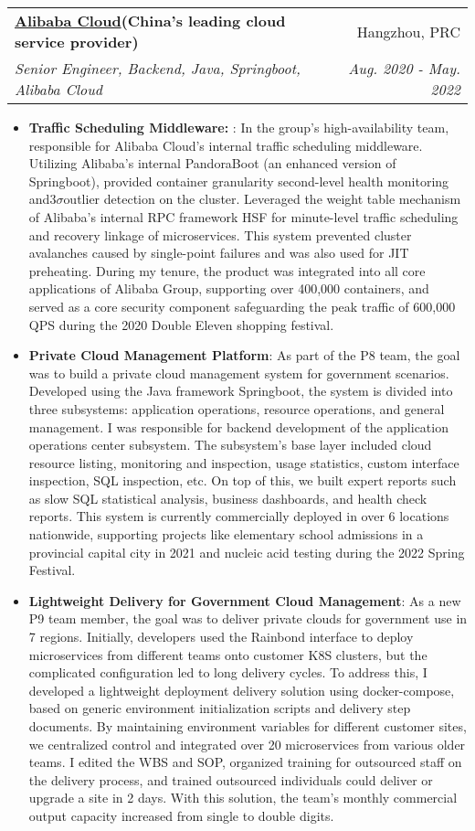 \documentclass[letterpaper,11pt]{article}
\makeatletter
\newcommand{\resumeItem}[2]{
	\item\small{
		\textbf{#1}{: #2 \vspace{-2pt}}
	}
}
\newcommand{\resumeSubheading}[4]{
	\vspace{-1pt}\item
	\begin{tabular*}{0.97\textwidth}[t]{l@{\extracolsep{\fill}}r}
		\textbf{#1} & #2 \\
		\textit{\small#3} & \textit{\small #4} \\
	\end{tabular*}\vspace{-5pt}
}
\newcommand{\resumeItemListStart}{\begin{itemize}}
\newcommand{\resumeItemListEnd}{\end{itemize}\vspace{-5pt}}
\makeatother
\begin{document}
\begin{spacing}{0.9}
	
	\resumeSubheading
	{\href{https://www.alibabacloud.com/}{Alibaba Cloud}(China's leading cloud service provider)}{Hangzhou, PRC}
	{Senior Engineer, Backend, Java, Springboot, Alibaba Cloud}{Aug. 2020 - May. 2022}
	\resumeItemListStart
	\resumeItem{Traffic Scheduling Middleware: }
	{In the group's high-availability team, responsible for Alibaba Cloud's internal traffic scheduling middleware. Utilizing Alibaba's internal PandoraBoot (an enhanced version of Springboot), provided container granularity second-level health monitoring and$3\sigma$outlier detection on the cluster. Leveraged the weight table mechanism of Alibaba's internal RPC framework HSF for minute-level traffic scheduling and recovery linkage of microservices. This system prevented cluster avalanches caused by single-point failures and was also used for JIT preheating. During my tenure, the product was integrated into all core applications of Alibaba Group, supporting over 400,000 containers, and served as a core security component safeguarding the peak traffic of 600,000 QPS during the 2020 Double Eleven shopping festival.}
	\resumeItem{Private Cloud Management Platform}
	{As part of the P8 team, the goal was to build a private cloud management system for government scenarios. Developed using the Java framework Springboot, the system is divided into three subsystems: application operations, resource operations, and general management. I was responsible for backend development of the application operations center subsystem. The subsystem's base layer included cloud resource listing, monitoring and inspection, usage statistics, custom interface inspection, SQL inspection, etc. On top of this, we built expert reports such as slow SQL statistical analysis, business dashboards, and health check reports. This system is currently commercially deployed in over 6 locations nationwide, supporting projects like elementary school admissions in a provincial capital city in 2021 and nucleic acid testing during the 2022 Spring Festival.}
	\resumeItem{Lightweight Delivery for Government Cloud Management}
	{As a new P9 team member, the goal was to deliver private clouds for government use in 7 regions. Initially, developers used the Rainbond interface to deploy microservices from different teams onto customer K8S clusters, but the complicated configuration led to long delivery cycles. To address this, I developed a lightweight deployment delivery solution using docker-compose, based on generic environment initialization scripts and delivery step documents. By maintaining environment variables for different customer sites, we centralized control and integrated over 20 microservices from various older teams. I edited the WBS and SOP, organized training for outsourced staff on the delivery process, and trained outsourced individuals could deliver or upgrade a site in 2 days. With this solution, the team's monthly commercial output capacity increased from single to double digits.}
	\resumeItemListEnd
	

\end{spacing}
\end{document}
